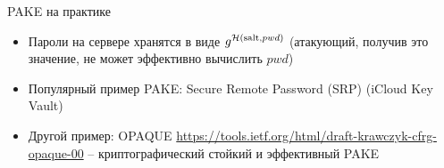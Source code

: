 \documentclass[usenames,dvipsnames,8pt,aspectratio=169]{beamer}
\begin{document}
\begin{frame}{PAKE на практике}
\Large
\begin{itemize}
\itemsep 10pt
\item Пароли на сервере хранятся в виде $g^{\mathcal{H}(\text{salt}, pwd)}$ (атакующий, получив это значение, не может эффективно вычислить $pwd$)
\item Популярный пример PAKE: Secure Remote Password (SRP) (iCloud Key Vault)
\item Другой пример: OPAQUE \url{https://tools.ietf.org/html/draft-krawczyk-cfrg-opaque-00} -- криптографический стойкий и эффективный PAKE
\end{itemize}
\end{frame}
\end{document}
